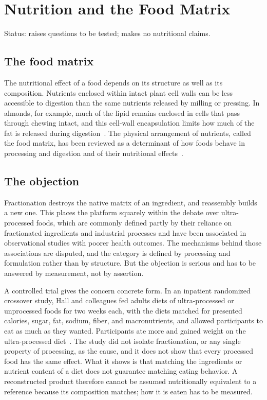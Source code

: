 \documentclass[11pt,openany]{book}
\theoremstyle{definition}
\begin{document}
\chapter{Nutrition and the Food Matrix}\label{ch:nutrition}

Status: raises questions to be tested; makes no nutritional claims.

\section{The food matrix}

The nutritional effect of a food depends on its structure as well as its composition. Nutrients enclosed within intact plant cell walls can be less accessible to digestion than the same nutrients released by milling or pressing. In almonds, for example, much of the lipid remains enclosed in cells that pass through chewing intact, and this cell-wall encapsulation limits how much of the fat is released during digestion~\cite{ellis2004}. The physical arrangement of nutrients, called the food matrix, has been reviewed as a determinant of how foods behave in processing and digestion and of their nutritional effects~\cite{aguilera2019}.

\section{The objection}

Fractionation destroys the native matrix of an ingredient, and reassembly builds a new one. This places the platform squarely within the debate over ultra-processed foods, which are commonly defined partly by their reliance on fractionated ingredients and industrial processes and have been associated in observational studies with poorer health outcomes. The mechanisms behind those associations are disputed, and the category is defined by processing and formulation rather than by structure. But the objection is serious and has to be answered by measurement, not by assertion.

A controlled trial gives the concern concrete form. In an inpatient randomized crossover study, Hall and colleagues fed adults diets of ultra-processed or unprocessed foods for two weeks each, with the diets matched for presented calories, sugar, fat, sodium, fiber, and macronutrients, and allowed participants to eat as much as they wanted. Participants ate more and gained weight on the ultra-processed diet~\cite{hall2019}. The study did not isolate fractionation, or any single property of processing, as the cause, and it does not show that every processed food has the same effect. What it shows is that matching the ingredients or nutrient content of a diet does not guarantee matching eating behavior. A reconstructed product therefore cannot be assumed nutritionally equivalent to a reference because its composition matches; how it is eaten has to be measured.
\end{document}
